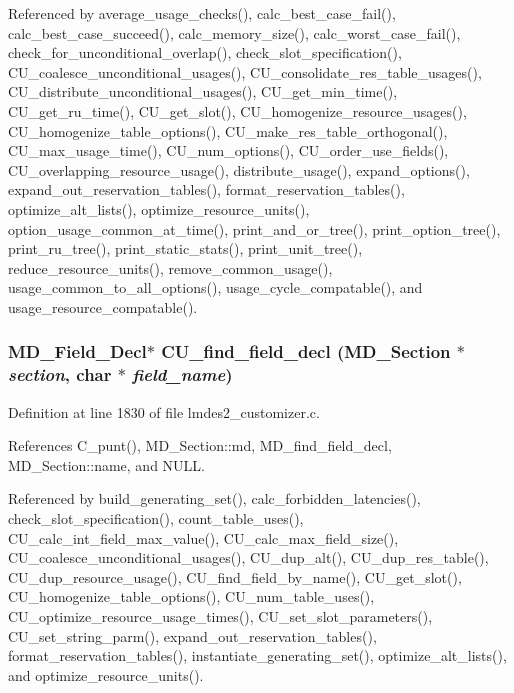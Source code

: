 Referenced by average\_\-usage\_\-checks(), calc\_\-best\_\-case\_\-fail(), calc\_\-best\_\-case\_\-succeed(), calc\_\-memory\_\-size(), calc\_\-worst\_\-case\_\-fail(), check\_\-for\_\-unconditional\_\-overlap(), check\_\-slot\_\-specification(), CU\_\-coalesce\_\-unconditional\_\-usages(), CU\_\-consolidate\_\-res\_\-table\_\-usages(), CU\_\-distribute\_\-unconditional\_\-usages(), CU\_\-get\_\-min\_\-time(), CU\_\-get\_\-ru\_\-time(), CU\_\-get\_\-slot(), CU\_\-homogenize\_\-resource\_\-usages(), CU\_\-homogenize\_\-table\_\-options(), CU\_\-make\_\-res\_\-table\_\-orthogonal(), CU\_\-max\_\-usage\_\-time(), CU\_\-num\_\-options(), CU\_\-order\_\-use\_\-fields(), CU\_\-overlapping\_\-resource\_\-usage(), distribute\_\-usage(), expand\_\-options(), expand\_\-out\_\-reservation\_\-tables(), format\_\-reservation\_\-tables(), optimize\_\-alt\_\-lists(), optimize\_\-resource\_\-units(), option\_\-usage\_\-common\_\-at\_\-time(), print\_\-and\_\-or\_\-tree(), print\_\-option\_\-tree(), print\_\-ru\_\-tree(), print\_\-static\_\-stats(), print\_\-unit\_\-tree(), reduce\_\-resource\_\-units(), remove\_\-common\_\-usage(), usage\_\-common\_\-to\_\-all\_\-options(), usage\_\-cycle\_\-compatable(), and usage\_\-resource\_\-compatable().
\subsubsection{\setlength{\rightskip}{0pt plus 5cm}\bf{MD\_\-Field\_\-Decl}$\ast$ CU\_\-find\_\-field\_\-decl (\bf{MD\_\-Section} $\ast$ {\em section}, char $\ast$ {\em field\_\-name})}\label{lmdes2__customizer_8c_b75391e91939a490c363358e9c12f40c}




Definition at line 1830 of file lmdes2\_\-customizer.c.

References C\_\-punt(), MD\_\-Section::md, MD\_\-find\_\-field\_\-decl, MD\_\-Section::name, and NULL.

Referenced by build\_\-generating\_\-set(), calc\_\-forbidden\_\-latencies(), check\_\-slot\_\-specification(), count\_\-table\_\-uses(), CU\_\-calc\_\-int\_\-field\_\-max\_\-value(), CU\_\-calc\_\-max\_\-field\_\-size(), CU\_\-coalesce\_\-unconditional\_\-usages(), CU\_\-dup\_\-alt(), CU\_\-dup\_\-res\_\-table(), CU\_\-dup\_\-resource\_\-usage(), CU\_\-find\_\-field\_\-by\_\-name(), CU\_\-get\_\-slot(), CU\_\-homogenize\_\-table\_\-options(), CU\_\-num\_\-table\_\-uses(), CU\_\-optimize\_\-resource\_\-usage\_\-times(), CU\_\-set\_\-slot\_\-parameters(), CU\_\-set\_\-string\_\-parm(), expand\_\-out\_\-reservation\_\-tables(), format\_\-reservation\_\-tables(), instantiate\_\-generating\_\-set(), optimize\_\-alt\_\-lists(), and optimize\_\-resource\_\-units().
